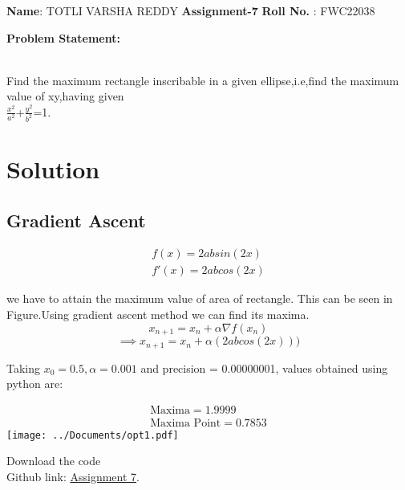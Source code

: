 \documentclass[10pt,a4paper]{report}
\begin{document}
\raggedright \textbf{Name}:\hspace{1mm} TOTLI VARSHA REDDY\hspace{3cm} \Large \textbf{Assignment-7}\hspace{2.5cm} 
\normalsize \textbf{Roll No.} :\hspace{1mm} FWC22038\vspace{1cm}
\begin{multicols}{2}

\raggedright \textbf{Problem Statement:}\vspace{2mm}
\raggedright \\Find the maximum rectangle inscribable in a given ellipse,i.e,find the maximum value of xy,having given\\
\large{$ \frac{x^2}{a^2}$+$\frac{y^2}{b^2}$=1.}\\
\vspace{5mm}


\section*{\large Solution}

	
    \subsection*{\normalsize Gradient Ascent}
    
    \begin{align}
	\label{eq:vol_varx}
	f(x) = 2absin(2x)\\
    f'(x) = 2abcos(2x)
	\end{align}

we have to attain the maximum value of area of rectangle. This can be seen in Figure.Using gradient ascent method we can find its maxima.
\begin{equation}
        x_{n+1} = x_n + \alpha \nabla f(x_n) 
\end{equation}
\vspace{1mm}
\begin{equation}
\implies x_{n+1}=x_n+\alpha(2abcos(2x)))
\end{equation}

Taking $x_0=0.5,\alpha=0.001$ and precision = 0.00000001, values obtained using python are:
    

    \begin{align}
        \boxed{\text{Maxima} = 1.9999}\\     
        \boxed{\text{Maxima Point} = 0.7853}
    \end{align}
  \texttt{[image: ../Documents/opt1.pdf]} 
\raggedright  Download the code \\
Github link: \href{https://github.com/9705701645/FWC/blob/main/optm1.py}{Assignment 7}.
  \end{multicols}
\end{document}
